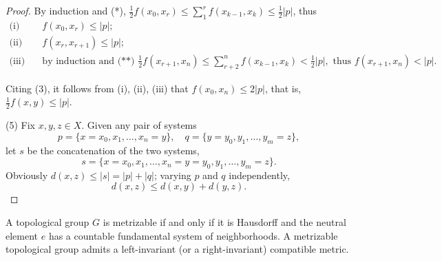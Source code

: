 \begin{proof}
    By induction and (*), $\tfrac{1}{2}f(x_0,x_r) \le \sum_1^r f(x_{k-1},x_k) \le \tfrac{1}{2}|p|$,    thus
    \begin{align*}
        \text{(i)}\quad   & f(x_0,x_r) \le |p|;                                                                                                                             \\
        \text{(ii)}\quad  & f(x_r,x_{r+1}) \le |p|;                                                                                                                         \\
        \text{(iii)}\quad & \text{by induction and (**) } \tfrac{1}{2}f(x_{r+1},x_n) \le \sum_{r+2}^n f(x_{k-1},x_k) < \tfrac{1}{2}|p|, \text{ thus } f(x_{r+1},x_n) < |p|.
    \end{align*}

    Citing (3), it follows from (i), (ii), (iii) that $f(x_0,x_n) \le 2|p|$, that is, $\tfrac{1}{2}f(x,y) \le |p|$.

    (5) Fix $x,y,z \in X$. Given any pair of systems
    \[
        p = \{x = x_0, x_1, \dots, x_n = y\}, \quad q = \{y = y_0, y_1, \dots, y_m = z\},
    \]
    let $s$ be the concatenation of the two systems,
    \[
        s = \{x = x_0, x_1, \dots, x_n = y = y_0, y_1, \dots, y_m = z\}.
    \]
    Obviously $d(x,z) \le |s| = |p| + |q|$; varying $p$ and $q$ independently,
    \[
        d(x,z) \le d(x,y) + d(y,z).
    \]
\end{proof}


\begin{theorem}
    \label{thm:birkhoff-kakutani}

    A topological group $G$ is metrizable if and only if it is Hausdorff and the neutral element $e$ has a countable fundamental system of neighborhoods. A metrizable topological group admits a left-invariant (or a right-invariant) compatible metric.
\end{theorem}

